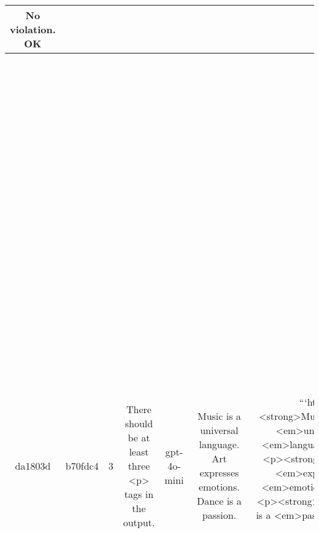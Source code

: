 \begin{table}[h!]
\begin{tabular}{|c|c|c|c|c|c|c|c|c|c|}
No violation.
OK & \\
\hline
da1803d & b70fdc4 & 3 & There should be at least three <p> tags in the output. & gpt-4o-mini & Music is a universal language. Art expresses emotions. Dance is a passion. & ```html
<p><strong>Music</strong> is a <em>universal</em> <em>language</em>.</p>
<p><strong>Art</strong> <em>expresses</em> <em>emotions</em>.</p>
<p><strong>Dance</strong> is a <em>passion</em>.</p>
``` & ok & The output provided by the chatbot has a total of three <p> tags, which meets the requirement of having at least three <p> tags. Each <p> tag contains a <strong> tag, which is in compliance with the description's instruction to have one <strong> tag within each <p> tag. Additionally, every <p> tag contains multiple <em> tags, fulfilling the requirement to add multiple <em> tags to emphasize key words and phrases within each sentence. Based on this evaluation, the output complies with the rules outlined in the chatbot's description.

No violation.
OK & \\
\hline
8b073ef & b70fdc4 & 3 & There should be at least three <p> tags in the output. & gpt-4o-mini & Books are a window to the world. Imagination is limitless. Dreams fuel ambition. & ```html
<p><strong>Books</strong> are a <em>window</em> to the <em>world</em>.</p>
<p><strong>Imagination</strong> is <em>limitless</em>.</p>
<p><strong>Dreams</strong> fuel <em>ambition</em>.</p>
<p><strong>Books</strong> are a <em>window</em> to the <em>world</em>.</p>
<p><strong>Imagination</strong> is <em>limitless</em>.</p>
<p><strong>Dreams</strong> fuel <em>ambition</em>.</p>
``` & ok & The chatbot description specifies that it should split the paragraph into individual sentences and wrap each sentence with a `<p>` tag. Moreover, the answer should have at least three `<p>` tags. Then, inside each `<p>` tag, it should add one `<strong>` tag and multiple `<em>` tags to emphasize key words and phrases.

Upon evaluating the output:
1. The output has more than three `<p>` tags, which is in compliance with the rule that states there should be at least three `<p>` tags.
2. Each `<p>` tag contains one `<strong>` tag, which is consistent with the guideline to have one `<strong>` tag inside each `<p>` tag.
3. Each `<p>` tag contains multiple `<em>` tags, fulfilling the rule that mentions adding multiple `<em>` tags to emphasize key words and phrases.

No rules were violated based solely on the description provided, as the compliance doesn't demand limiting the number of `<p>` tags beyond three. 


\end{tabular}
\end{table}
